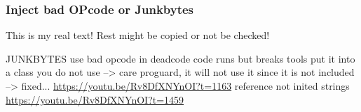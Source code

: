 \subsubsection{Inject bad OPcode or Junkbytes} \label{subsubsection:counter-reengineering-break-inject}
This is my real text! Rest might be copied or not be checked!


JUNKBYTES\newline
use bad opcode in deadcode \newline
code runs but breaks tools\newline
put it into a class you do not use --> care proguard, it will not use it since it is not included\newline
--> fixed...\newline
\url{https://youtu.be/Rv8DfXNYnOI?t=1163}\newline
reference not inited strings\newline
\url{https://youtu.be/Rv8DfXNYnOI?t=1459}
